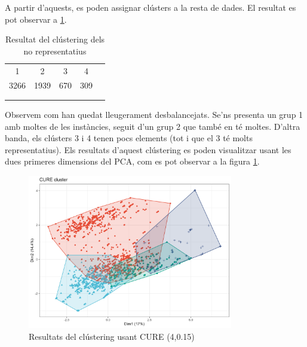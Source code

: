 \documentclass{article}
\begin{document}
A partir d’aquests, es poden assignar clústers a la resta de dades. El resultat es pot observar a \ref{tab:CURE_taulanorep}.

\begin{table}[H]
\centering
\begin{tabular}{lllll}
\cline{1-4}
\multicolumn{1}{|c|}{1}    & \multicolumn{1}{c|}{2}    & \multicolumn{1}{c|}{3}   & \multicolumn{1}{c|}{4}   &  \\ \cline{1-4}
\multicolumn{1}{|c|}{3266} & \multicolumn{1}{c|}{1939} & \multicolumn{1}{c|}{670} & \multicolumn{1}{c|}{309} &  \\ \cline{1-4}
                           &                           &                          &                          &  \\
                           &                           &                          &                          & 
\end{tabular}
\caption{Resultat del clústering dels no representatius}
\label{tab:CURE_taulanorep}
\end{table}

Observem com han quedat lleugerament desbalancejats. Se’ns presenta un grup 1 amb moltes de les instàncies, seguit d'un grup 2 que també en té moltes. D'altra banda, els clústers 3 i 4 tenen pocs elements (tot i que el 3 té molts representatius). Els resultats d'aquest clústering es poden visualitzar usant les dues primeres dimensions del PCA, com es pot observar a la figura \ref{fig:CURE_res}.

\begin{figure}[H]
    \centering
    \includegraphics[width=0.8\textwidth]{Images/4_clustering/CURE/cure.png}
    \caption{Resultats del clústering usant CURE (4,0.15)}
    \label{fig:CURE_res}
\end{figure}
\end{document}
